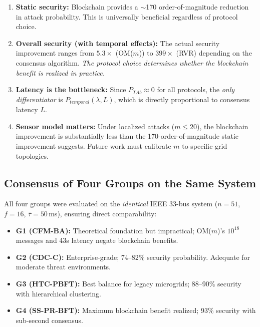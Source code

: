 \documentclass[10pt,twocolumn,letterpaper]{article}
\begin{document}
\begin{enumerate}[leftmargin=*]
    \item \textbf{Static security:} Blockchain provides a $\sim$170 order-of-magnitude reduction in attack probability. This is universally beneficial regardless of protocol choice.

    \item \textbf{Overall security (with temporal effects):} The actual security improvement ranges from $5.3\times$ (OM($m$)) to $399\times$ (RVR) depending on the consensus algorithm. \emph{The protocol choice determines whether the blockchain benefit is realized in practice.}

    \item \textbf{Latency is the bottleneck:} Since $P_{TAb} \approx 0$ for all protocols, the \emph{only differentiator} is $P_{temporal}(\lambda, L)$, which is directly proportional to consensus latency $L$.

    \item \textbf{Sensor model matters:} Under localized attacks ($m \leq 20$), the blockchain improvement is substantially less than the 170-order-of-magnitude static improvement suggests. Future work must calibrate $m$ to specific grid topologies.
\end{enumerate}

\subsection{Consensus of Four Groups on the Same System}

All four groups were evaluated on the \emph{identical} IEEE 33-bus system ($n=51$, $f=16$, $\bar{\tau}=50$\,ms), ensuring direct comparability:
\begin{itemize}[leftmargin=*]
    \item \textbf{G1 (CFM-BA):} Theoretical foundation but impractical; OM($m$)'s $10^{18}$ messages and 43s latency negate blockchain benefits.
    \item \textbf{G2 (CDC-C):} Enterprise-grade; 74--82\% security probability. Adequate for moderate threat environments.
    \item \textbf{G3 (HTC-PBFT):} Best balance for legacy microgrids; 88--90\% security with hierarchical clustering.
    \item \textbf{G4 (SS-PR-BFT):} Maximum blockchain benefit realized; 93\% security with sub-second consensus.
\end{itemize}
\end{document}
